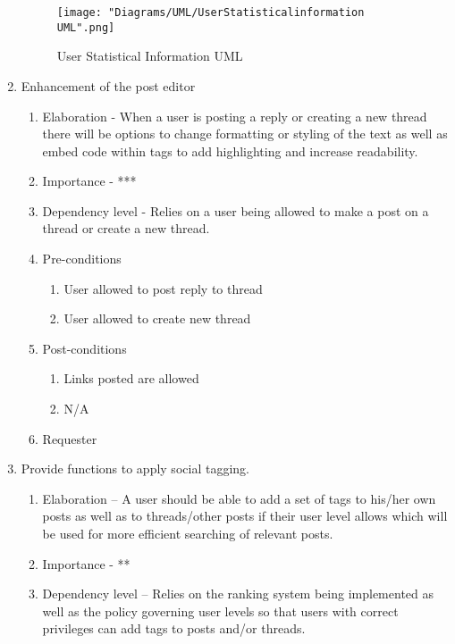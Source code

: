 \documentclass[12pt]{article}
\begin{document}
\begin{enumerate}
     \begin{figure}[h]
     	\centering
     	\texttt{[image: "Diagrams/UML/UserStatisticalinformation UML".png]}
     	\caption{User Statistical Information UML}
     \end{figure}
\clearpage %
   \item Enhancement of the post editor %
  \begin{enumerate}
    \item Elaboration - When a user is posting a reply or creating a new thread there will be options to change formatting or styling of the text as well as embed code within tags to add highlighting and increase readability.
    \item Importance - ***
    \item Dependency level - Relies on a user being allowed to make a post on a thread or create a new thread.
    \item Pre-conditions
    \begin{enumerate}
    	\item User allowed to post reply to thread
    	\item User allowed to create new thread
    \end{enumerate}
        \item Post-conditions
    \begin{enumerate}
    	\item Links posted are allowed
    	\item N/A
    \end{enumerate}
    \item Requester
  \end{enumerate}
\clearpage %
   \item  Provide functions to apply social tagging. %
  \begin{enumerate}
    \item Elaboration – A user should be able to add a set of tags to his/her own posts as well as to threads/other posts if their user level allows which will be used for more efficient searching of relevant posts. 
    \item Importance - **
    \item Dependency level – Relies on the ranking system being implemented as well as the policy governing user levels so that users with correct privileges can add tags to posts and/or threads.

\end{enumerate}
\end{enumerate}
\end{document}
